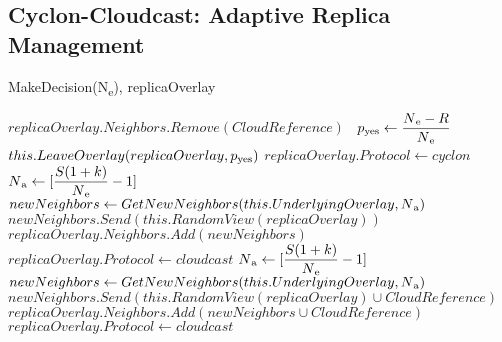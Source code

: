 \documentclass[runningheads]{llncs}
\begin{document}
\subsection{Cyclon-Cloudcast: Adaptive Replica Management}

\begin{algorithm}[ht]
\caption{MakeDecision(N\textsubscript{e}), replicaOverlay}
\label{alg:makedecision}
\begin{algorithmic}
        \State $replicaOverlay.Neighbors.Remove(CloudReference)$\
            \State $p\textsubscript{yes} \gets \dfrac{N\textsubscript{e} - R}{N\textsubscript{e}}$
            \State $this.LeaveOverlay(replicaOverlay, p\textsubscript{yes})$
        \State $replicaOverlay.Protocol \gets cyclon$
        \EndIf
        \State $N\textsubscript{a} \gets [\dfrac{S(1 + k)}{N\textsubscript{e}} - 1]$
        \State $newNeighbors \gets GetNewNeighbors(this.UnderlyingOverlay, N\textsubscript{a})$
        \State $newNeighbors.Send(this.RandomView(replicaOverlay))$
        \State $replicaOverlay.Neighbors.Add(newNeighbors)$
        \State $replicaOverlay.Protocol \gets cloudcast$
        \State $N\textsubscript{a} \gets [\dfrac{S(1 + k)}{N\textsubscript{e}} - 1]$
        \State $newNeighbors \gets GetNewNeighbors(this.UnderlyingOverlay, N\textsubscript{a})$
        \State $newNeighbors.Send(this.RandomView(replicaOverlay) \cup CloudReference)$
        \State $replicaOverlay.Neighbors.Add(newNeighbors \cup CloudReference)$
        \State $replicaOverlay.Protocol \gets cloudcast$
    \EndIf
\end{algorithmic}
\end{algorithm}
\end{document}
